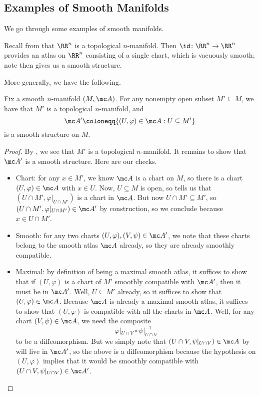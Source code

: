\documentclass[../notes.tex]{subfiles}
\begin{document}
\subsection{Examples of Smooth Manifolds}
We go through some examples of smooth manifolds.
\begin{example} \label{ex:rn-sm-manifold}
	Recall from  that $\RR^n$ is a topological $n$-manifold. Then $\id\colon\RR^n\to\RR^n$ provides an atlas on $\RR^n$ consisting of a single chart, which is vacuously smooth; note  then gives us a smooth structure.
\end{example}
More generally, we have the following.
\begin{proposition} \label{prop:open-sm-manifold}
	Fix a smooth $n$-manifold $(M,\mc A)$. For any nonempty open subset $M'\subseteq M$, we have that $M'$ is a topological $n$-manifold, and
	\[\mc A'\coloneqq\{(U,\varphi)\in\mc A:U\subseteq M'\}\]
	is a smooth structure on $M$.
\end{proposition}
\begin{proof}
	By , we see that $M'$ is a topological $n$-manifold. It remains to show that $\mc A'$ is a smooth structure. Here are our checks.
	\begin{itemize}
		\item Chart: for any $x\in M'$, we know $\mc A$ is a chart on $M$, so there is a chart $(U,\varphi)\in\mc A$ with $x\in U$. Now, $U\subseteq M$ is open, so  tells us that $(U\cap M',\varphi|_{U\cap M'})$ is a chart in $\mc A$. But now $U\cap M'\subseteq M'$, so $(U\cap M',\varphi|_{U\cap M'})\in\mc A'$ by construction, so we conclude because $x\in U\cap M'$.
		\item Smooth: for any two charts $(U,\varphi),(V,\psi)\in\mc A'$, we note that these charts belong to the smooth atlas $\mc A$ already, so they are already smoothly compatible.
		\item Maximal: by definition of being a maximal smooth atlas, it suffices to show that if $(U,\varphi)$ is a chart of $M'$ smoothly compatible with $\mc A'$, then it must be in $\mc A'$. Well, $U\subseteq M'$ already, so it suffices to show that $(U,\varphi)\in\mc A$. Because $\mc A$ is already a maximal smooth atlas, it suffices to show that $(U,\varphi)$ is compatible with all the charts in $\mc A$. Well, for any chart $(V,\psi)\in\mc A$, we need the composite
		\[\varphi|_{U\cap V}\circ\psi|_{U\cap V}^{-1}\]
		to be a diffeomorphism. But we simply note that $(U\cap V,\psi|_{U\cap V})\in\mc A$ by  will live in $\mc A'$, so the above is a diffeomorphism because the hypothesis on $(U,\varphi)$ implies that it would be smoothly compatible with $(U\cap V,\psi|_{U\cap V})\in\mc A'$.
		\qedhere
	\end{itemize}
\end{proof}
\end{document}
